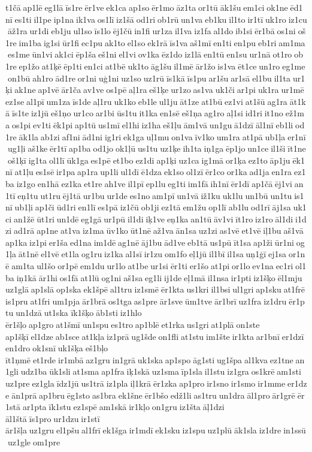 t1čā ap1lē eg1lā īs1re ēr1ve ek1ca ap1so ēr1mo āz1ta or1tū āk1šu em1ci ok1ne ēd1nī es1ti il1pe ip1na ik1va os1lī iz1šā od1ri ob1rū un1va eb1ku il1to ir1tī uk1ro iz1cu āž1ra ur1di eb1ju ul1so īs1lo ēj1čū in1fi ur1za il1va iz1fa al1do ib1si ēr1bā os1ni oš1re im1ba ig1si ūr1fi ec1pu ak1to el1so ek1rā īs1va aš1mī en1ti en1pu eb1ri am1ma es1me ūn1vi ak1ci ēp1ša eš1ni el1vi ov1ka ēz1do iz1lā en1tū en1su ur1nā ot1ro ob1re ep1žo at1ķē ēp1ti en1ci at1bē uk1to āg1šu il1mē ār1žo is1va ēt1ce un1ro eg1me on1bū ah1ro ād1re or1ni uģ1ni uz1so uz1rū īs1kā īs1pu ar1šu ar1sā el1bu il1ta ur1ķi ak1ne ap1vē ār1ča av1ve os1pē aļ1ra eš1ķe ur1zo as1va uk1či ar1pi uk1ra ur1mē ez1se al1pī um1za īs1de aļ1ru uk1ko eb1le ul1ju āt1ze at1bū ez1vi at1šū ag1ra āt1kā īs1te iz1jū eš1ņo ur1co ar1bi ūs1tu it1ka en1sē eš1ņa ag1ro aļ1si id1ri it1no ež1ma os1pi ev1ti ēk1pi ap1tū us1mī el1hi iz1ha eš1ļu ām1vā un1gu ā1dzī āl1nī eb1li od1re āk1la ab1zi af1ni ād1ni ig1ri ek1ga uļ1mu on1va īv1ko um1ra at1pā ub1ļa er1nī ug1ļi aš1ke ēr1tī ap1ba od1jo ok1ļū us1tu uz1ķe ih1ta iņ1ga ēp1jo un1ce il1ši īt1ne oš1ķī ig1ta ol1lī ūk1ga es1pē et1bo ez1di ap1ķi uz1ca ig1mā or1ķa ez1to āp1ju ēk1nī at1ļu es1sē ir1pa ap1ra up1li ul1dī ē1dza ek1so ol1zī ēr1co or1ka ad1ja en1ra ez1ba iz1go en1hā ez1ka et1re ah1ve il1pī ep1lu eg1ti im1fā ih1nī ēr1dī ap1čā ēj1vi an1tī eņ1tu ut1ru ēj1tā ur1bu ur1de es1no am1pī un1vā iž1ku uk1lu un1bū un1tu is1nī ub1ļi ap1či ūd1ri en1lī es1pā iz1čū ob1ji ez1tā em1žu op1lī ab1lu od1rī āj1sa uk1ci an1žē ūt1ri un1dē eg1gā ur1pū il1di iķ1ve eņ1ka an1tū āv1vi īt1ro iz1ro āl1di i1dzi ad1rā ap1ne at1va iz1ma ūv1ko ūt1nē až1va ān1sa uz1zi as1vē et1vē iļ1bu aš1vā ap1ka iz1pi er1ša ed1na im1dē ag1nē āj1bu ād1ve eb1tā us1pū īt1sa ap1ži ūr1ni og1ļa āt1nē el1vē et1la og1ru iz1ka al1sī ir1zu om1fo eļ1jū il1bī il1sa uņ1ģī ej1sa or1nē am1ta ul1šo or1pē em1du ur1lo at1be ur1si ēr1ti er1šo at1pi or1lo ev1na ec1ri ol1ba iņ1kā ār1hi os1fā at1lū og1ni aš1sa eg1li ij1de eļ1mā il1nsa ir1pti iz1šķo ēl1mju uz1glā ap1slā op1ska ek1špē al1tru iz1smē ēr1kta us1kri il1bsi ul1gri ap1sku at1frē is1pru at1fri um1pja ār1brā os1tga as1pre ār1sve ūm1tve ār1brī uz1fra iz1dru ēr1ptu un1dzā ut1ska 	īk1šķo āb1sti iz1hlo 	ēr1šļo ap1gro at1šmī un1spu es1tro ap1blē et1rka us1gri at1plā on1ste 	ap1šķī el1dze ab1sce at1kļa iz1prā ug1šde on1fli at1stu im1šte ir1kta ar1bnī er1dzī en1dro ok1snī uk1šķa eš1bļo 	īt1ņmē et1rde ir1mbā az1gru in1grā uk1ska ap1spo āg1sti ug1špa al1kva ez1tne an1gli udz1ba ūk1sli at1sma ap1fra iķ1skā uz1sma īp1sla il1stu iz1gra os1krē am1sti uz1pre ez1gla īdz1jū us1trā iz1pla iļ1krā ēr1zka ap1pro ir1sno ir1smo ir1mme er1dze ān1prā ap1bru ēg1sto as1bra ek1šne ēr1bšo edž1li as1tru un1dra āl1pro ār1grē ēr1stā ar1pta īk1stu ez1spē am1skā ir1kļo on1gru iz1šta āļ1dzi 	āl1štā īs1pro ur1dzu ir1stī 	ār1šļa uz1gru el1pšu al1frī ek1šga ir1mdī ek1sku iz1spu uz1plū āk1sla iz1dre in1ssū uz1gle om1pre 